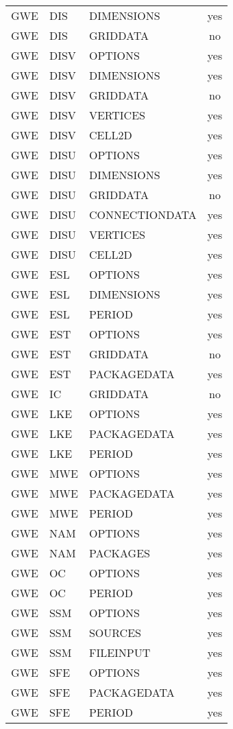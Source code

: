 \begin{longtable}{p{1.5cm} p{1.5cm} p{3cm} c}
GWE & DIS & DIMENSIONS & yes \\ 
GWE & DIS & GRIDDATA & no \\ 
\hline
GWE & DISV & OPTIONS & yes \\ 
GWE & DISV & DIMENSIONS & yes \\ 
GWE & DISV & GRIDDATA & no \\ 
GWE & DISV & VERTICES & yes \\ 
GWE & DISV & CELL2D & yes \\ 
\hline
GWE & DISU & OPTIONS & yes \\ 
GWE & DISU & DIMENSIONS & yes \\ 
GWE & DISU & GRIDDATA & no \\ 
GWE & DISU & CONNECTIONDATA & yes \\ 
GWE & DISU & VERTICES & yes \\ 
GWE & DISU & CELL2D & yes \\ 
\hline
GWE & ESL & OPTIONS & yes \\ 
GWE & ESL & DIMENSIONS & yes \\ 
GWE & ESL & PERIOD & yes \\ 
\hline
GWE & EST & OPTIONS & yes \\ 
GWE & EST & GRIDDATA & no \\ 
GWE & EST & PACKAGEDATA & yes \\ 
\hline
GWE & IC & GRIDDATA & no \\ 
\hline
GWE & LKE & OPTIONS & yes \\ 
GWE & LKE & PACKAGEDATA & yes \\ 
GWE & LKE & PERIOD & yes \\ 
\hline
GWE & MWE & OPTIONS & yes \\ 
GWE & MWE & PACKAGEDATA & yes \\ 
GWE & MWE & PERIOD & yes \\ 
\hline
GWE & NAM & OPTIONS & yes \\ 
GWE & NAM & PACKAGES & yes \\ 
\hline
GWE & OC & OPTIONS & yes \\ 
GWE & OC & PERIOD & yes \\ 
\hline
GWE & SSM & OPTIONS & yes \\ 
GWE & SSM & SOURCES & yes \\ 
GWE & SSM & FILEINPUT & yes \\ 
\hline
GWE & SFE & OPTIONS & yes \\ 
GWE & SFE & PACKAGEDATA & yes \\ 
GWE & SFE & PERIOD & yes \\ 

\end{longtable}
